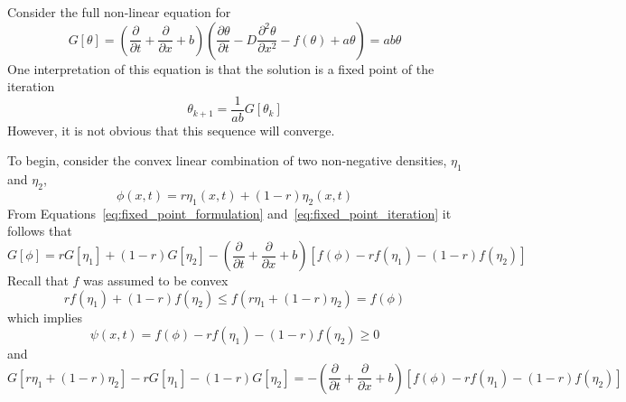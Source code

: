 \documentclass[12pt]{amsart}
\begin{document}
Consider the full non-linear equation for 
\begin{equation}
G\left[\theta\right] = \left(\frac{\partial}{\partial t} + \frac{\partial}{\partial x} +
  b\right)\left( \frac{\partial\theta}{\partial t}
  -D\frac{\partial^2\theta}{\partial x^2}- f(\theta) +
  a\theta\right) = ab\theta
  \label{eq:full_non_linear_theta}
\end{equation}
One interpretation of this equation is that the solution is a fixed
point of the iteration
\begin{equation}
  \theta_{k+1} = \frac{1}{ab}G\left[\theta_{k}\right]
  \label{eq:fixed_point_iteration}
\end{equation}
However, it is not obvious that this sequence will converge.

To begin, consider the convex linear combination of two non-negative densities,
$\eta_1$ and $\eta_2$,
\begin{equation}
  \phi(x, t) = r\eta_1(x, t)+(1-r)\eta_2(x, t) 
\end{equation}
From Equations~\ref{eq:fixed_point_formulation}
and~\ref{eq:fixed_point_iteration} it follows that
\begin{equation}
G[\phi] = rG[\eta_1] + (1-r)G[\eta_2] - \left(\frac{\partial}{\partial t} + \frac{\partial}{\partial x} +
b\right)\left[f\left(\phi\right) - rf(\eta_1)-(1-r)f(\eta_2)\right]
\end{equation}
Recall that $f$ was assumed to be convex
\begin{equation}
rf(\eta_1)+(1-r)f(\eta_2) \le
f\left(r\eta_1+(1-r)\eta_2\right) = f(\phi)
\end{equation}
which implies
\begin{equation}
  \psi(x, t) = f\left(\phi\right) - rf(\eta_1)-(1-r)f(\eta_2) \ge 0
\end{equation}
and
\begin{equation}
  G\left[r\eta_1+(1-r)\eta_2\right] - rG\left[\eta_1\right] - (1-r)
  G\left[\eta_2\right] = - \left(\frac{\partial}{\partial t} +\frac{\partial}{\partial x} +
b\right)\left[f\left(\phi\right) - rf(\eta_1)-(1-r)f(\eta_2)\right]
\end{equation}



\end{document}
